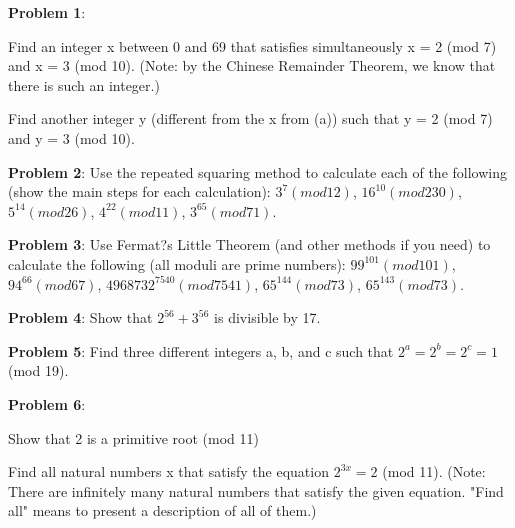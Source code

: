 \documentclass[12pt,letterpaper,final]{report}
\begin{document}

\vline


\noindent\textbf{Problem 1}: 
 
\begin{alphalist}
	\item Find an integer x between 0 and 69 that satisfies simultaneously x = 2 (mod 7) and x = 3 (mod 10). 		(Note: by the Chinese Remainder Theorem, we know that there is such an integer.)
	\item Find another integer y (different from the x from (a)) such that  y = 2  (mod 7) and  y = 3 (mod 10).
\end{alphalist}

\bigskip
\noindent\textbf{Problem 2}:  Use the repeated squaring method to calculate each of the following (show the main steps for each calculation): $3^{7} (mod 12)$,  $16^{10} (mod 230)$,  $5^{14} (mod 26)$,  $4^{22} (mod 11)$,  $3^{65} (mod 71)$.


\bigskip

\bigskip
\noindent\textbf{Problem 3}: Use Fermat?s Little Theorem (and other methods if you need) to calculate the following (all moduli are prime numbers):  $99^{101} (mod 101)$,  $94^{66} (mod 67)$,  $4968732^{7540} (mod 7541)$,  $65^{144} (mod 73)$,  $65^{143} (mod 73)$.

\bigskip




\bigskip
\noindent\textbf{Problem 4}: Show that $2^{56} + 3^{56}$ is divisible by 17. 

\bigskip
\noindent\textbf{Problem 5}: Find three different integers a, b, and c such that $2^{a} = 2^{b} = 2^{c} = 1$ (mod 19).

\bigskip
\noindent\textbf{Problem 6}:
\begin{alphalist2}
	\item Show that 2 is a primitive root (mod 11)
	\item Find all natural numbers x that satisfy the equation $2^{3x} = 2$ (mod 11). (Note:  There are infinitely 	many natural numbers that satisfy the given equation. "Find all" means to present a description of all of them.)

\end{alphalist2}
\end{document}
